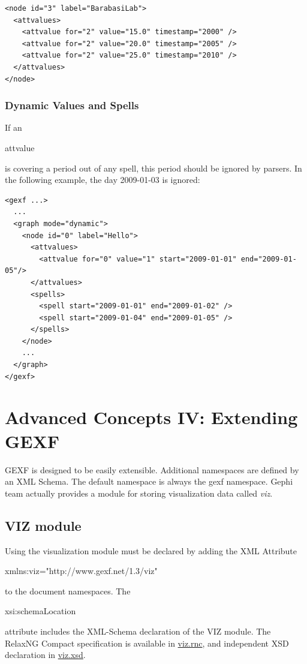 \documentclass[a4paper,10pt]{article}
\begin{document}
\lstset{ style=gexf }
\begin{lstlisting}[caption={Using timestamp representation}]
<node id="3" label="BarabasiLab">
  <attvalues>
    <attvalue for="2" value="15.0" timestamp="2000" />
    <attvalue for="2" value="20.0" timestamp="2005" />
    <attvalue for="2" value="25.0" timestamp="2010" />
  </attvalues>
</node>
\end{lstlisting}

\subsubsection{Dynamic Values and Spells}

If an \begin{footnotesize}attvalue\end{footnotesize} is covering a period out of any spell, this period should be ignored by parsers. In the following example, the day 2009-01-03 is ignored:

\lstset{ style=gexf }
\begin{lstlisting}[caption={Spells and attvalues}]
<gexf ...>
  ...
  <graph mode="dynamic">
    <node id="0" label="Hello">
      <attvalues>
        <attvalue for="0" value="1" start="2009-01-01" end="2009-01-05"/>
      </attvalues>
      <spells>
        <spell start="2009-01-01" end="2009-01-02" />
        <spell start="2009-01-04" end="2009-01-05" />
      </spells>
    </node>
    ...
  </graph>
</gexf>
\end{lstlisting}

\section{Advanced Concepts IV: Extending GEXF} \label{extendgexf}

GEXF is designed to be easily extensible. Additional namespaces are defined by an XML Schema. The default namespace is always the gexf namespace. Gephi team actually provides a module for storing visualization data called \textit{viz}.

\subsection{VIZ module} \label{viz}

Using the visualization module must be declared by adding the XML Attribute \begin{footnotesize}xmlns:viz="http://www.gexf.net/1.3/viz"\end{footnotesize} to the document namespaces. The \begin{footnotesize}xsi:schemaLocation\end{footnotesize} attribute includes the XML-Schema declaration of the VIZ module. The RelaxNG Compact specification is available in \href{http://www.gexf.net/1.3/viz.rnc}{viz.rnc}, and independent XSD declaration in \href{http://www.gexf.net/1.3/viz.xsd}{viz.xsd}.
\end{document}
